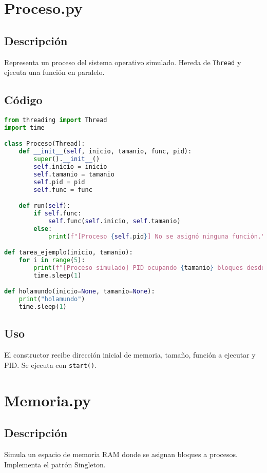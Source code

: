 \documentclass[11pt]{article}
\begin{document}
\newpage

\section{Proceso.py}

\subsection{Descripción}
Representa un proceso del sistema operativo simulado. Hereda de \texttt{Thread} y ejecuta una función en paralelo.

\subsection{Código}
\begin{lstlisting}[language=Python, caption={Proceso.py}]
from threading import Thread
import time

class Proceso(Thread):
    def __init__(self, inicio, tamanio, func, pid):
        super().__init__()
        self.inicio = inicio
        self.tamanio = tamanio
        self.pid = pid
        self.func = func

    def run(self):
        if self.func:
            self.func(self.inicio, self.tamanio)
        else:
            print(f"[Proceso {self.pid}] No se asignó ninguna función.")

def tarea_ejemplo(inicio, tamanio):
    for i in range(5):
        print(f"[Proceso simulado] PID ocupando {tamanio} bloques desde {inicio}... ({i + 1}/5)")
        time.sleep(1)

def holamundo(inicio=None, tamanio=None):
    print("holamundo")
    time.sleep(1)
\end{lstlisting}

\subsection{Uso}
El constructor recibe dirección inicial de memoria, tamaño, función a ejecutar y PID. Se ejecuta con \texttt{start()}.

\newpage

\section{Memoria.py}

\subsection{Descripción}
Simula un espacio de memoria RAM donde se asignan bloques a procesos. Implementa el patrón Singleton.
\end{document}
